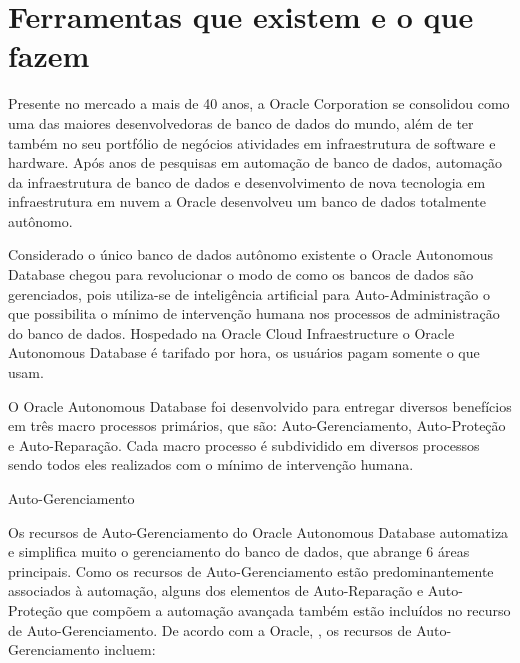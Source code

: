 \section{Ferramentas que existem e o que fazem}

Presente no mercado a mais de 40 anos, a Oracle Corporation se consolidou como uma das maiores desenvolvedoras de banco de dados do mundo, além de ter também no seu portfólio de negócios atividades em infraestrutura de software e hardware.  Após anos de pesquisas em automação de banco de dados, automação da infraestrutura de banco de dados e desenvolvimento de nova tecnologia em infraestrutura em nuvem a Oracle desenvolveu um banco de dados totalmente autônomo.

Considerado o único banco de dados autônomo existente o Oracle Autonomous Database chegou para revolucionar o modo de como os bancos de dados são gerenciados, pois utiliza-se de inteligência artificial para Auto-Administração o que possibilita o mínimo de intervenção humana nos processos de administração do banco de dados. Hospedado na Oracle Cloud Infraestructure o Oracle Autonomous Database é tarifado por hora, os usuários pagam somente o que usam.

O Oracle Autonomous Database foi desenvolvido para entregar diversos benefícios em três macro processos primários, que são: Auto-Gerenciamento, Auto-Proteção e Auto-Reparação. Cada macro processo é subdividido em diversos processos sendo todos eles realizados com o mínimo de intervenção humana.


Auto-Gerenciamento


Os recursos de Auto-Gerenciamento do Oracle Autonomous Database automatiza e simplifica muito o gerenciamento do banco de dados, que abrange 6 áreas principais. Como os recursos de Auto-Gerenciamento estão predominantemente associados à automação, alguns dos elementos de Auto-Reparação e Auto-Proteção que compõem a automação avançada também estão incluídos no recurso de Auto-Gerenciamento. De acordo com a Oracle, \cite{WPGestao}, os recursos de Auto-Gerenciamento incluem:

